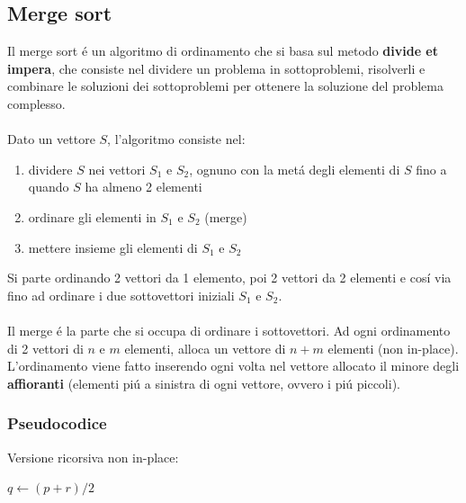 \documentclass{article}
\begin{document}
\subsection{Merge sort}
Il merge sort é un algoritmo di ordinamento che si basa sul metodo \textbf{divide et impera}, che consiste nel dividere un problema in sottoproblemi, risolverli e combinare le soluzioni dei sottoproblemi per ottenere la soluzione del problema complesso.\\\\
Dato un vettore $S$, l'algoritmo consiste nel:
\begin{enumerate}
	\item dividere $S$ nei vettori $S_1$ e $S_2$, ognuno con la metá degli elementi di $S$ fino a quando $S$ ha almeno 2 elementi
	\item ordinare gli elementi in $S_1$ e $S_2$ (merge)
	\item mettere insieme gli elementi di $S_1$ e $S_2$
\end{enumerate}
Si parte ordinando 2 vettori da 1 elemento, poi 2 vettori da 2 elementi e cosí via fino ad ordinare i due sottovettori iniziali $S_1$ e $S_2$.\\\\
Il merge é la parte che si occupa di ordinare i sottovettori. Ad ogni ordinamento di 2 vettori di $n$ e $m$ elementi, alloca un vettore di $n+m$ elementi (non in-place). L'ordinamento viene fatto inserendo ogni volta nel vettore allocato il minore degli \textbf{affioranti} (elementi piú a sinistra di ogni vettore, ovvero i piú piccoli).

\subsubsection{Pseudocodice}
Versione ricorsiva non in-place:
\begin{algorithmic}
	\State $q \gets (p+r)/2$
	\State {} 
	\State {} 
	\State {}
\EndIf
\EndFunction
\end{algorithmic}
\end{document}
